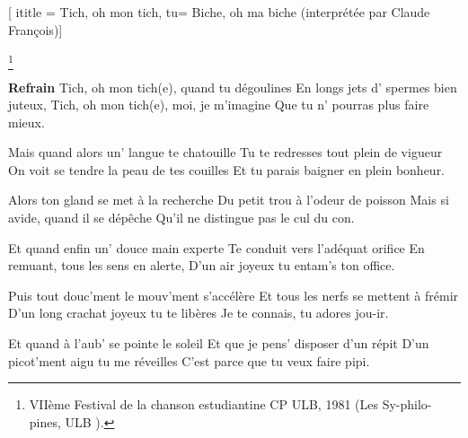  [
ititle = {Tich, oh mon tich},
tu= {Biche, oh ma biche (interprétée par Claude François)}]

\footnote {VIIème Festival de la chanson estudiantine CP ULB, 1981 (Les Sy-philo-pines, ULB ).}

\beginchorus
\textbf {Refrain}
Tich, oh mon tich(e), quand tu dégoulines
En longs jets d' spermes bien juteux,
Tich, oh mon tich(e), moi, je m'imagine
Que tu n' pourras plus faire mieux.
\endchorus

\beginverse
Mais quand alors un' langue te chatouille
Tu te redresses tout plein de vigueur
On voit se tendre la peau de tes couilles
Et tu parais baigner en plein bonheur.
\endverse

\beginverse
Alors ton gland se met à la recherche
Du petit trou à l'odeur de poisson
Mais si avide, quand il se dépêche
Qu'il ne distingue pas le cul du con.
\endverse

\beginverse
Et quand enfin un' douce main experte
Te conduit vers l'adéquat orifice
En remuant, tous les sens en alerte,
D'un air joyeux tu entam's ton office.
\endverse

\beginverse
Puis tout douc'ment le mouv'ment s'accélère
Et tous les nerfs se mettent à frémir
D'un long crachat joyeux tu te libères
Je te connais, tu adores jou-ir.
\endverse

\beginverse
Et quand à l'aub' se pointe le soleil
Et que je pens' disposer d'un répit
D'un picot'ment aigu tu me réveilles
C'est parce que tu veux faire pipi.
\endverse

\endsong